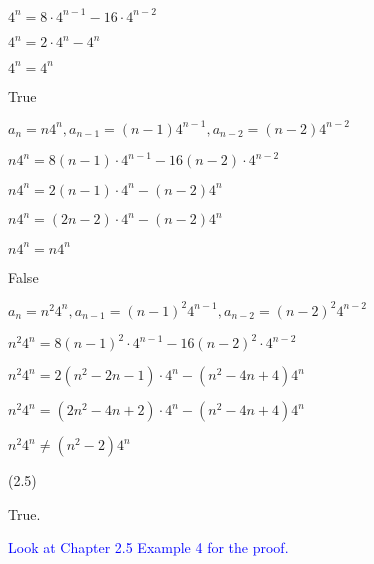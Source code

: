 \documentclass{exam}
\begin{document}
\begin{questions}
\begin{subparts}
\begin{center}
\( 4^n = 8 \cdot 4^{n-1} - 16 \cdot 4^{n-2} \)

\( 4^n = 2 \cdot 4^{n} -  4^{n} \)

\( 4^n = 4^n \)

\end{center}


\begin{center}
True

\( a_n = n4^n, a_{n-1} = (n-1)4^{n-1}, a_{n-2} = (n-2)4^{n-2} \)

\( n4^n = 8(n-1) \cdot 4^{n-1} - 16(n-2) \cdot 4^{n-2} \)

\( n4^n = 2(n-1) \cdot 4^{n} - (n-2)4^{n} \)

\( n4^n = (2n-2) \cdot 4^{n} - (n-2)4^n \)

\( n4^n = n4^{n} \)

\end{center}


\begin{center}
False

\( a_n = n^2 4^n, a_{n-1} = (n-1)^2 4^{n-1}, a_{n-2} = (n-2)^2 4^{n-2} \)

\( n^2 4^n = 8(n-1)^2 \cdot 4^{n-1} - 16(n-2)^2 \cdot 4^{n-2} \)

\( n^2 4^n = 2(n^2-2n-1) \cdot 4^{n} - (n^2-4n+4)4^{n} \)

\( n^2 4^n = (2n^2-4n+2) \cdot 4^{n} - (n^2-4n+4)4^n \)

\( n^2 4^n \neq (n^2-2)4^{n} \)

\end{center}

\end{subparts}

 (2.5)
\begin{subparts}

\begin{center}

True.

\textcolor{blue}{Look at Chapter 2.5 Example 4 for the proof.}

\end{center}


\begin{center}


\end{center}
\end{subparts}
\end{questions}
\end{document}

